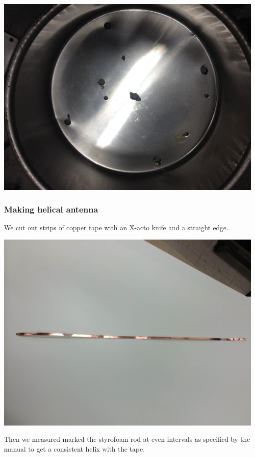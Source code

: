 \documentclass[11pt]{article} %
\begin{document}
\begin{center}
\includegraphics[scale=0.12]{feed/08.jpeg}
\end{center}

\subsubsection{Making helical antenna}
We cut out strips of copper tape with an X-acto knife and a straight edge. 

\begin{center}
\includegraphics[scale=0.10]{feed/09.jpeg}
\end{center}

Then we measured marked the styrofoam rod at even intervals as specified by the manual to get a consistent helix with the tape. 
\end{document}
